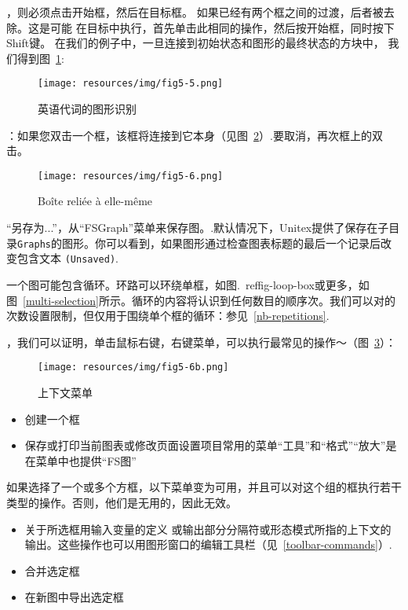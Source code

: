 \bigskip
{}，则必须点击开始框，然后在目标框。
如果已经有两个框之间的过渡，后者被去除。这是可能
在目标中执行，首先单击此相同的操作，然后按开始框，同时按下Shift键。
在我们的例子中，一旦连接到初始状态和图形的最终状态的方块中，
我们得到图~\ref{fig-pronoun-graph}:

\begin{figure}[!ht]
\begin{center}
\texttt{[image: resources/img/fig5-5.png]}
\caption{英语代词的图形识别\label{fig-pronoun-graph}}
\end{center}
\end{figure}

\bigskip
{}：如果您双击一个框，该框将连接到它本身（见图~\ref{fig-loop-box}）.要取消，再次框上的双击。
\bigskip
\begin{figure}[!h]
\begin{center}
\texttt{[image: resources/img/fig5-6.png]}
\caption{Boîte reliée à elle-même\label{fig-loop-box}}
\end{center}
\end{figure}

“另存为...”，从“FSGraph”菜单来保存图。.默认情况下，Unitex提供了保存在子目录\verb+Graphs+的图形。你可以看到，如果图形通过检查图表标题的最后一个记录后改变包含文本 \verb+(Unsaved)+.

\bigskip
\noindent  一个图可能包含循环。环路可以环绕单框，如图.~ref{fig-loop-box}或更多，如图~\ref{multi-selection}所示。循环的内容将认识到任何数目的顺序次。我们可以对的次数设置限制，但仅用于围绕单个框的循环：参见~\ref{nb-repetitions}.

\bigskip
{}，我们可以证明，单击鼠标右键，右键菜单，可以执行最常见的操作〜（图~\ref{contextual-menu}）：

\bigskip
\begin{figure}[!h]
\begin{center}
\texttt{[image: resources/img/fig5-6b.png]}
\caption{上下文菜单\label{contextual-menu}}
\end{center}
\end{figure}

\begin{itemize}
\item 创建一个框
\item 保存或打印当前图表或修改页面设置项目常用的菜单“工具”和“格式”“放大”是在菜单中也提供“FS图”\end{itemize}
如果选择了一个或多个方框，以下菜单变为可用，并且可以对这个组的框执行若干类型的操作。否则，他们是无用的，因此无效。\begin{itemize}
\item 关于所选框用输入变量的定义 
或输出部分分隔符或形态模式所指的上下文的输出。这些操作也可以用图形窗口的编辑工具栏（见~\ref{toolbar-commands}）. 
\item 合并选定框
\item 在新图中导出选定框
\end{itemize}


